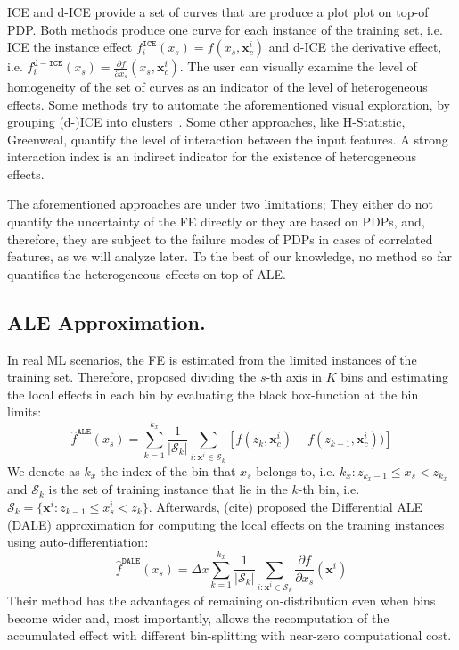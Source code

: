 \documentclass[twoside]{article}
\newcommand{\xc}{\mathbf{x}_c}
\newcommand{\xb}{\mathbf{x}}
\begin{document}
ICE and d-ICE\citep{goldstein2015peeking} provide a set of curves that
are produce a plot plot on top-of PDP. Both methods produce one curve
for each instance of the training set, i.e. ICE the instance effect
\(f^{\mathtt{ICE}}_i(x_s) = f(x_s, \xc^i)\) and d-ICE the derivative
effect, i.e.
\(f^{\mathtt{d-ICE}}_i(x_s) = \frac{\partial f}{\partial x_s} (x_s,
\xc^i)\). The user can visually examine the level of homogeneity of
the set of curves as an indicator of the level of heterogeneous
effects. Some methods try to automate the aforementioned visual
exploration, by grouping (d-)ICE into clusters~\citep{molnar2020model,
  herbinger2022repid}. Some other approaches, like H-Statistic,
Greenweal, quantify the level of interaction between the input
features. A strong interaction index is an indirect indicator for the
existence of heterogeneous effects.

The aforementioned approaches are under two limitations; They either
do not quantify the uncertainty of the FE directly or they are based
on PDPs, and, therefore, they are subject to the failure modes of PDPs
in cases of correlated features, as we will analyze later. To the best
of our knowledge, no method so far quantifies the heterogeneous
effects on-top of ALE.

\subsection{ALE Approximation.}
\label{sec:ale-approximation}

In real ML scenarios, the FE is estimated from the limited instances
of the training set. Therefore, \citep{apley2020visualizing} proposed
dividing the \(s\)-th axis in \(K\) bins and estimating the local
effects in each bin by evaluating the black box-function at the bin
limits:
\begin{equation}
  \label{eq:ALE_accumulated_mean_est}
  \hat{f}^{\mathtt{ALE}}(x_s) = \sum_{k=1}^{k_x} \frac{1}{|\mathcal{S}_k|} \sum_{i:\mathbf{x}^i \in
    \mathcal{S}_k} \left [ f(z_{k}, \xc^i) - f(z_{k-1}, \xc^i)) \right ]
\end{equation}
We denote as \(k_x\) the index of the bin that \(x_s\) belongs to,
i.e. \(k_x: z_{k_x-1} \leq x_s < z_{k_x} \) and \(\mathcal{S}_k\) is
the set of training instance that lie in the \(k\)-th bin, i.e.
\( \mathcal{S}_k = \{ \xb^i : z_{k-1} \leq x^i_s < z_{k} \}
\). Afterwards, (cite) proposed the Differential ALE (DALE)
approximation for computing the local effects on the training
instances using auto-differentiation:
\begin{equation}
  \label{eq:DALE_accumulated_mean_est}
  \hat{f}^{\mathtt{DALE}}(x_s) = \Delta x \sum_{k=1}^{k_x} \frac{1}{|\mathcal{S}_k|} \sum_{i:\mathbf{x}^i \in
    \mathcal{S}_k} \frac{\partial f}{\partial x_s}(\mathbf{x}^i)
\end{equation}
%
Their method has the advantages of remaining on-distribution even when
bins become wider and, most importantly, allows the recomputation of
the accumulated effect with different bin-splitting with near-zero
computational cost.
\end{document}
